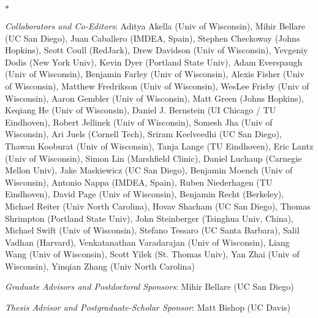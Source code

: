 \documentclass[10pt]{article}
\newcommand{\highlight}[1]{\textsf{\emph{#1}}}
\newcommand{\myitemize}{
   \begin{list}{$*$}
    {  \setlength{\leftmargin}{4em} \setlength{\labelwidth}{2em}
       } }
\newcommand{\myitemizeend}{
    \end{list}  }
\begin{document}
\myitemize
\item \highlight{Collaborators and Co-Editors}:
Aditya Akella (Univ of Wisconsin),
Mihir Bellare (UC San Diego),
Juan Caballero (IMDEA, Spain),
Stephen Checkoway (Johns Hopkins),
Scott Coull (RedJack),
Drew Davidson (Univ of Wisconsin),
Yevgeniy Dodis (New York Univ),
Kevin Dyer (Portland State Univ),
Adam Everspaugh (Univ of Wisconsin),
Benjamin Farley (Univ of Wisconsin),
Alexis Fisher (Univ of Wisconsin),
Matthew Fredrikson (Univ of Wisconsin),
WesLee Frisby (Univ of Wisconsin),
Aaron Gembler (Univ of Wisconsin),
Matt Green (Johns Hopkins),
Keqiang He (Univ of Wisconsin),
Daniel J. Bernstein (UI Chicago / TU Eindhoven),
Robert Jellinek (Univ of Wisconsin),
Somesh Jha (Univ of Wisconsin),
Ari Juels (Cornell Tech),
Sriram Keelveedhi  (UC San Diego),
Thawan Kooburat (Univ of Wisconsin),
Tanja Lange (TU Eindhoven),
Eric Lantz (Univ of Wisconsin),
Simon Lin (Marshfield Clinic),
Daniel Luchaup (Carnegie Mellon Univ),
Jake Maskiewicz (UC San Diego),
Benjamin Moench (Univ of Wisconsin),
Antonio Nappa (IMDEA, Spain),
Ruben Niederhagen (TU Eindhoven),
David Page (Univ of Wisconsin),
Benjamin Recht (Berkeley),
Michael Reiter (Univ North Carolina),
Hovav Shacham (UC San Diego),
Thomas Shrimpton (Portland State Univ),
John Steinberger (Tsinghua Univ, China),
Michael Swift (Univ of Wisconsin),
Stefano Tessaro (UC Santa Barbara),
Salil Vadhan (Harvard),
Venkatanathan Varadarajan  (Univ of Wisconsin),
Liang Wang (Univ of Wisconsin),
Scott Yilek (St. Thomas Univ),
Yan Zhai (Univ of Wisconsin),
Yinqian Zhang (Univ North Carolina)
\item \highlight{Graduate Advisors and Postdoctoral Sponsors}: Mihir Bellare (UC San Diego)
\item \highlight{Thesis Advisor and Postgraduate-Scholar Sponsor}: Matt Bishop (UC Davis)
\myitemizeend
\end{document}
